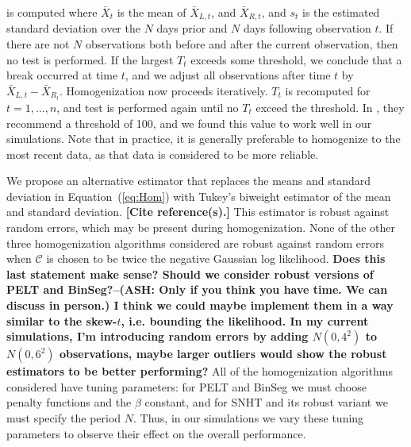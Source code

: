 \documentclass[12pt]{article}
\def\ni{\noindent}
\begin{document}
\begin{doublespacing}
\ni is computed where $\bar{X}_t$ is the mean of $\bar{X}_{L,t}$, and $\bar{X}_{R,t}$, and $s_t$ is the estimated standard deviation over the $N$ days prior and $N$ days following observation $t$.  If there are not $N$ observations both before and after the current observation, then no test is performed.  If the largest $T_t$ exceeds some threshold, we conclude that a break occurred at time $t$, and we adjust all observations after time $t$ by $\bar{X}_{L,t}-\bar{X}_{R_t}$.  Homogenization now proceeds iteratively.  $T_t$ is recomputed for $t=1,\ldots,n$, and test is   performed  again until no $T_t$ exceed the threshold.  In \cite{haimberger07}, they recommend a threshold of 100, and we found this value to work well in our simulations.  Note that in practice, it is generally preferable to homogenize to the most recent data, as that data is considered to be more reliable.  
































We propose an alternative estimator that replaces the means and standard deviation in Equation~(\ref{eq:Hom}) with Tukey's biweight estimator of the mean and standard deviation.  \textbf{[Cite reference(s).]}  This estimator is  robust against random errors, which may be present during homogenization.  None of the other three homogenization algorithms considered are robust against random errors when $\mathcal{C}$ is chosen to be twice the negative Gaussian log likelihood. \textbf{Does this last statement make sense?  Should we consider robust versions of PELT and BinSeg?--(ASH: Only if you think you have time. We can discuss in person.)  I think we could maybe implement them in a way similar to the skew-$t$, i.e. bounding the likelihood.  In my current simulations, I'm introducing random errors by adding $N(0,4^2)$ to $N(0,6^2)$ observations, maybe larger outliers would show the robust estimators to be better performing?}  All of the homogenization algorithms considered have tuning parameters: for PELT and BinSeg we must choose penalty functions and the $\beta$ constant, and for SNHT and its robust variant we must specify the period $N$.  Thus, in our simulations we vary these tuning parameters to observe their effect on the overall performance.


\end{doublespacing}
\end{document}
